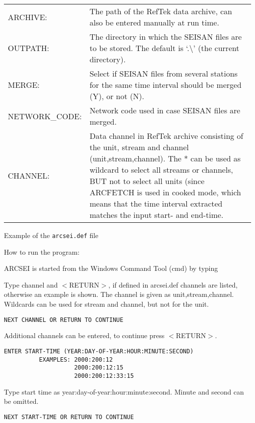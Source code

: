 \begin{tabular}{lp{10cm}}
ARCHIVE: & The path of the RefTek data archive, can also be entered manually at run time. \\
OUTPATH: & The directory in which the SEISAN files are to be stored. The default is `.\textbackslash'  
(the current directory). \\
MERGE: & Select if SEISAN files from several stations for the same time interval should  
be merged (Y), or not (N). \\
NETWORK\_CODE: & Network code used in case SEISAN files are merged. \\
CHANNEL: & Data channel in RefTek archive consisting of the unit, stream and channel  
(unit,stream,channel). The * can be used as wildcard to select all streams or  channels, BUT not to select all units (since ARCFETCH is used in cooked mode,  which means that the time interval extracted  matches the input start- and end-time. \\
\end{tabular}

Example of the \texttt{arcsei.def} file 



How to run the program: 

ARCSEI is started from the Windows Command Tool (cmd) by typing  



Type channel and $<$RETURN$>$, if defined in arcsei.def channels are listed, otherwise an example is shown. The channel is given as unit,stream,channel. Wildcards can be used for stream and channel, but not for the unit. 
\begin{verbatim}
NEXT CHANNEL OR RETURN TO CONTINUE 
\end{verbatim}

Additional channels can be entered, to continue press $<$RETURN$>$. 

\begin{verbatim}
ENTER START-TIME (YEAR:DAY-OF-YEAR:HOUR:MINUTE:SECOND)
          EXAMPLES: 2000:200:12 
                    2000:200:12:15 
                    2000:200:12:33:15 
\end{verbatim}

Type start time as year:day-of-year:hour:minute:second. Minute and second can be omitted.  

\begin{verbatim}
NEXT START-TIME OR RETURN TO CONTINUE 
\end{verbatim}

